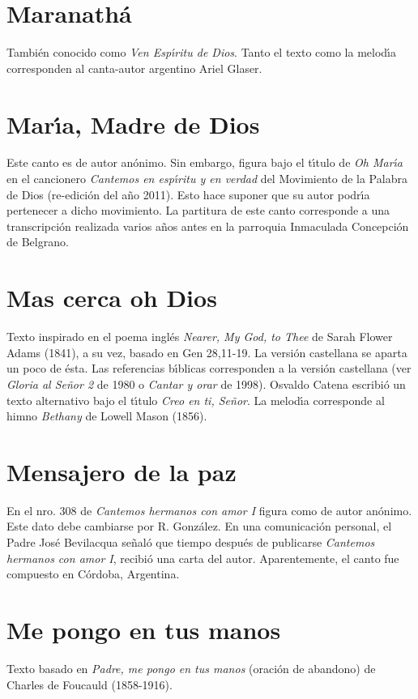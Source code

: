 \documentclass[landscape,12pt]{report}
\begin{document}
\section*{\small Maranath\'a} \noindent\footnotesize Tambi\'en conocido como \textit{Ven Esp\'\i ritu de Dios}. Tanto el texto como la melod\'\i a corresponden al canta-autor argentino Ariel Glaser. 
\section*{\small Mar\'\i a, Madre de Dios} \noindent\footnotesize Este canto es de autor an\'onimo. Sin embargo, figura bajo el t\'\i tulo de \textit{Oh Mar\'\i a} en el cancionero \textit{Cantemos en esp\'\i ritu y en verdad} del Movimiento de la Palabra de Dios (re-edici\'on del a\~no 2011). Esto hace suponer que su autor podr\'\i a pertenecer a dicho movimiento. La partitura de este canto corresponde a una transcripci\'on realizada varios a\~nos antes en la parroquia Inmaculada Concepci\'on de Belgrano.    
\section*{\small Mas cerca oh Dios} \noindent\footnotesize Texto inspirado en el poema ingl\'es \textit{Nearer, My God, to Thee} de Sarah Flower Adams (1841), a su vez, basado en Gen 28,11-19. La versi\'on castellana se aparta un poco de \'esta. Las referencias b\'\i blicas corresponden a la versi\'on castellana (ver \textit{Gloria al Se\~nor 2} de 1980 o \textit{Cantar y orar} de 1998). Osvaldo Catena escribi\'o un texto alternativo bajo el t\'\i tulo \textit{Creo en ti, Se\~nor}. La melod\'\i a corresponde al himno \textit{Bethany} de Lowell Mason (1856). 
\section*{\small Mensajero de la paz} \noindent\footnotesize En el nro. 308 de \textit{Cantemos hermanos con amor I} figura como de autor an\'onimo. Este dato debe cambiarse por R. Gonz\'alez. En una comunicaci\'on personal, el Padre Jos\'e Bevilacqua se\~nal\'o que tiempo despu\'es de publicarse \textit{Cantemos hermanos con amor I}, recibi\'o una carta del autor. Aparentemente, el canto fue compuesto en C\'ordoba, Argentina.
\section*{\small Me pongo en tus manos} \noindent\footnotesize Texto basado en \textit{Padre, me pongo en tus manos} (oraci\'on de abandono) de Charles de Foucauld (1858-1916). 
\end{document}
